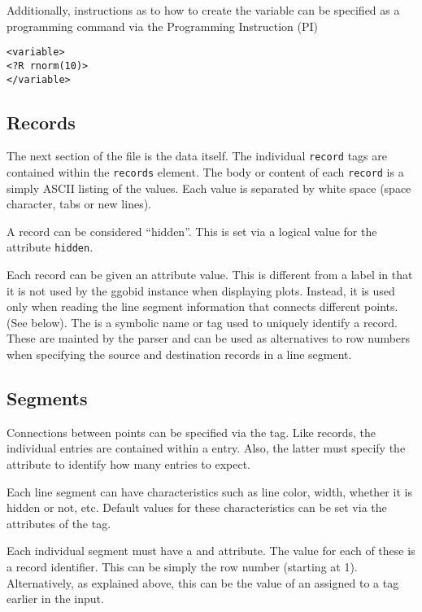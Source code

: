 \documentclass{article}
\begin{document}
Additionally, instructions as to how to create the variable can be
specified as a programming command via the Programming Instruction
(PI)
\begin{verbatim}
<variable>
<?R rnorm(10)>
</variable>
\end{verbatim}

\subsection{Records}
The next section of the file is the data itself.  The individual
\texttt{record} tags are contained within the \texttt{records}
element.  The body or content of each \texttt{record} is a simply
ASCII listing of the values. Each value is separated by white space
(space character, tabs or new lines).


A record can be considered ``hidden''.  This is set via a logical
value for the attribute \texttt{hidden}.


Each record can be given an  attribute value.  This
is different from a label in that it is not used by the ggobid
instance when displaying plots.  Instead, it is used only when reading
the line segment information that connects different points.  (See
below). The  is a symbolic name or tag used to
uniquely identify a record.  These are mainted by the parser and can
be used as alternatives to row numbers when specifying the source and
destination records in a line segment.


\subsection{Segments}
Connections between points can be specified via the 
tag.  Like records, the individual  entries are
contained within a  entry.  Also, the latter must
specify the  attribute to identify how many entries
to expect.

Each line segment can have characteristics such as line color, width,
whether it is hidden or not, etc.  Default values for these
characteristics can be set via the attributes of the 
tag.

Each individual segment must have a  and
 attribute.  The value for each of these is
a record identifier.  This can be simply the row number (starting at
1).  Alternatively, as explained above, this can be the value of an
 assigned to a  tag earlier in
the input.
\end{document}
